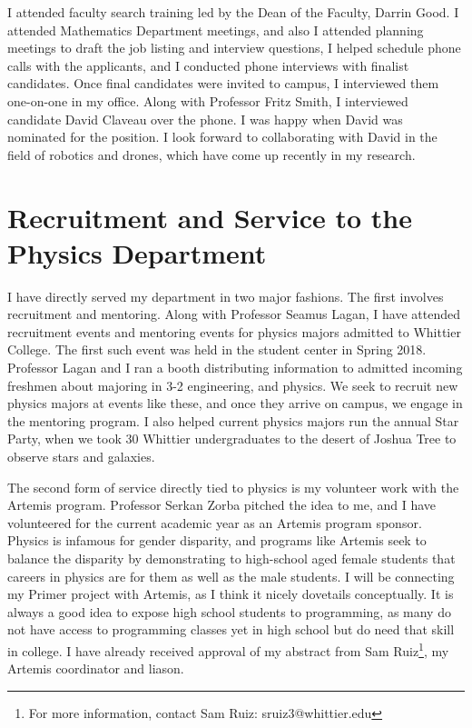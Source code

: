 \documentclass[../main.tex]{subfiles}
\begin{document}
I attended faculty search training led by the Dean of the Faculty, Darrin Good.  I attended Mathematics Department meetings, and also I attended planning meetings to draft the job listing and interview questions, I helped schedule phone calls with the applicants, and I conducted phone interviews with finalist candidates.  Once final candidates were invited to campus, I interviewed them one-on-one in my office.  Along with Professor Fritz Smith, I interviewed candidate David Claveau over the phone.  I was happy when David was nominated for the position.  I look forward to collaborating with David in the field of robotics and drones, which have come up recently in my research. \\ \hspace{0.1cm}

\section{Recruitment and Service to the Physics Department}

I have directly served my department in two major fashions.  The first involves recruitment and mentoring.  Along with Professor Seamus Lagan, I have attended recruitment events and mentoring events for physics majors admitted to Whittier College.  The first such event was held in the student center in Spring 2018.  Professor Lagan and I ran a booth distributing information to admitted incoming freshmen about majoring in 3-2 engineering, and physics.  We seek to recruit new physics majors at events like these, and once they arrive on campus, we engage in the mentoring program. I also helped current physics majors run the annual Star Party, when we took 30 Whittier undergraduates to the desert of Joshua Tree to observe stars and galaxies.  \\ \hspace{0.1cm}

The second form of service directly tied to physics is my volunteer work with the Artemis program.  Professor Serkan Zorba pitched the idea to me, and I have volunteered for the current academic year as an Artemis program sponsor.  Physics is infamous for gender disparity, and programs like Artemis seek to balance the disparity by demonstrating to high-school aged female students that careers in physics are for them as well as the male students.  I will be connecting my Primer project with Artemis, as I think it nicely dovetails conceptually.  It is always a good idea to expose high school students to programming, as many do not have access to programming classes yet in high school but do need that skill in college.  I have already received approval of my abstract from Sam Ruiz\footnote{For more information, contact Sam Ruiz: sruiz3@whittier.edu}, my Artemis coordinator and liason. \\ \hspace{0.1cm}
\end{document}
